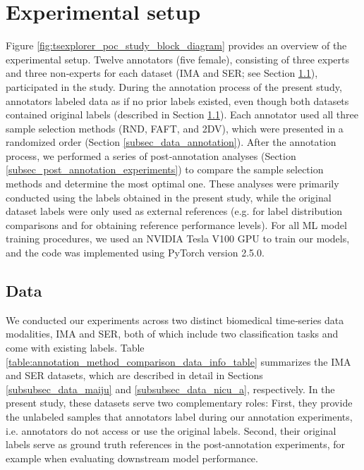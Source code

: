 \documentclass[a4paper,fleqn]{cas-dc}
\begin{document}
\section{Experimental setup} \label{sec_experimental_setup}

Figure \ref{fig:tsexplorer_poc_study_block_diagram} provides an overview of the experimental setup. Twelve annotators (five female), consisting of three experts and three non‑experts for each dataset (IMA and SER; see Section \ref{subsec_data}), participated in the study. During the annotation process of the present study, annotators labeled data as if no prior labels existed, even though both datasets contained original labels (described in Section \ref{subsec_data}). Each annotator used all three sample selection methods (RND, FAFT, and 2DV), which were presented in a randomized order (Section \ref{subsec_data_annotation}). After the annotation process, we performed a series of post‑annotation analyses (Section \ref{subsec_post_annotation_experiments}) to compare the sample selection methods and determine the most optimal one. These analyses were primarily conducted using the labels obtained in the present study, while the original dataset labels were only used as external references (e.g. for label distribution comparisons and for obtaining reference performance levels). For all ML model training procedures, we used an NVIDIA Tesla V100 GPU to train our models, and the code was implemented using PyTorch version 2.5.0.

\subsection{Data} \label{subsec_data}

We conducted our experiments across two distinct biomedical time‑series data modalities, IMA and SER, both of which include two classification tasks and come with existing labels. Table \ref{table:annotation_method_comparison_data_info_table} summarizes the IMA and SER datasets, which are described in detail in Sections \ref{subsubsec_data_maiju} and \ref{subsubsec_data_nicu_a}, respectively. In the present study, these datasets serve two complementary roles: First, they provide the unlabeled samples that annotators label during our annotation experiments, i.e. annotators do not access or use the original labels. Second, their original labels serve as ground truth references in the post-annotation experiments, for example when evaluating downstream model performance.
\end{document}
